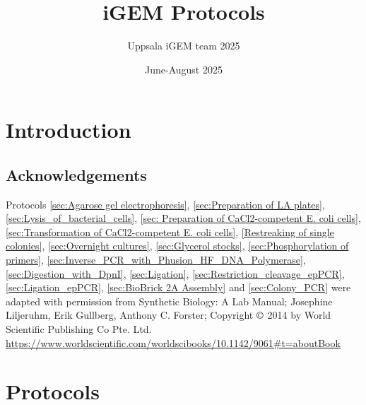 \documentclass{article}
\title{iGEM Protocols}
\author{Uppsala iGEM team 2025}
\date{June-August 2025}
\begin{document}
\maketitle
\newpage

\tableofcontents
\newpage

\section{Introduction}
\subsection{Acknowledgements}
Protocols \ref{sec:Agarose gel electrophoresis}, \ref{sec:Preparation of LA plates}, \ref{sec:Lysis_of_bacterial_cells}, \ref{sec: Preparation of CaCl2-competent E. coli cells}, \ref{sec:Transformation of CaCl2-competent E. coli cells}, \ref{Restreaking of single colonies}, \ref{sec:Overnight cultures}, \ref{sec:Glycerol stocks}, \ref{sec:Phosphorylation of primers}, \ref{sec:Inverse_PCR_with_Phusion_HF_DNA_Polymerase}, \ref{sec:Digestion_with_DpnI}, \ref{sec:Ligation}, \ref{sec:Restriction_cleavage_epPCR}, \ref{sec:Ligation_epPCR}, \ref{sec:BioBrick 2A Assembly} and \ref{sec:Colony_PCR} were adapted with permission from Synthetic Biology: A Lab Manual; Josephine Liljeruhm, Erik Gullberg, Anthony C. Forster; Copyright $\copyright$ 2014 by World Scientific Publishing Co Pte. Ltd. \url{https://www.worldscientific.com/worldscibooks/10.1142/9061#t=aboutBook}
\newpage

\section{Protocols}


\end{document}

